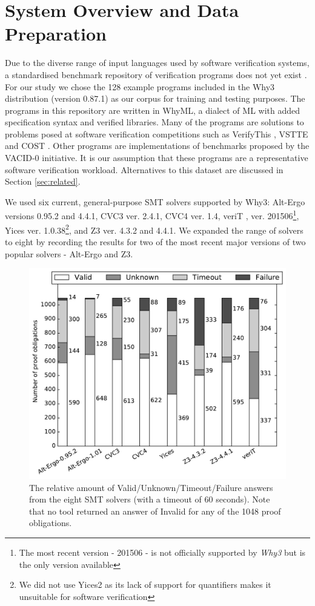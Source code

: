 \documentclass[runningheads,a4paper]{llncs}
\begin{document}
\section{System Overview and Data Preparation}
\label{sec:overview}

Due to the diverse range of input languages used by software verification systems, a standardised benchmark repository of verification programs does not yet exist \cite{Dagstuhl}.
For our study we chose the 128 example programs included in the \textsf{Why3} distribution (version 0.87.1) as our corpus for training and testing purposes. The programs in this repository are written in WhyML, a dialect of ML with added specification syntax and verified libraries. Many of the programs are solutions to problems posed at software verification competitions such as VerifyThis \cite{verifythis}, VSTTE \cite{Klebanov2011} and COST \cite{bormer:hal-00789525}. Other programs are implementations of benchmarks proposed by the VACID-0 \cite{Leino10vacid-0:verification} initiative.   It is our assumption that these programs are a representative software verification workload. Alternatives to this dataset are discussed in Section \ref{sec:related}. 
    
We used six current, general-purpose SMT solvers supported by \textsf{Why3}: Alt-Ergo \cite{AltErgo} versions 0.95.2 and 4.4.1, CVC3 \cite{CVC3} ver. 2.4.1, CVC4 \cite{CVC4} ver. 1.4, veriT \cite{veriT}, ver. 201506\footnote{The most recent version - 201506 - is not officially supported by \textit{\textsf{Why3}} but is the only version available}, Yices \cite{Yices} ver. 1.0.38\footnote{We did not use Yices2 as its lack of support for quantifiers makes it unsuitable for software verification}, and Z3 \cite{Z3} ver. 4.3.2 and 4.4.1. We expanded the range of solvers to eight by recording the results for two of the most recent major versions of two popular solvers - Alt-Ergo and Z3.


\begin{figure}
\centering
\includegraphics[width=0.7\linewidth]{barcharts}
\caption{The relative amount of Valid/Unknown/Timeout/Failure answers from the eight SMT solvers (with a timeout of 60 seconds). Note that no tool returned an answer of Invalid for any of the 1048 proof obligations.}
\label{fig:barcharts}
\end{figure}
    
\end{document}
